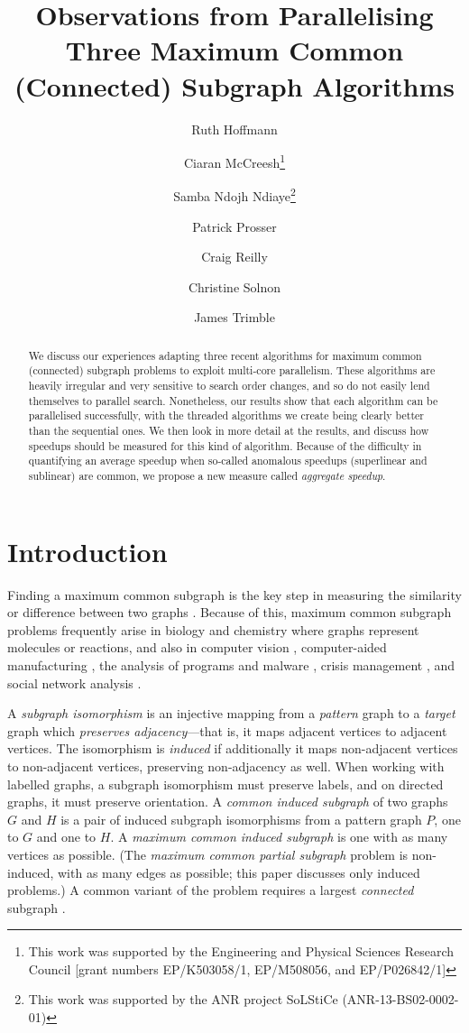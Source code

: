 \documentclass{llncs}
\title{Observations from Parallelising Three Maximum Common (Connected) Subgraph Algorithms}
\author{
    Ruth Hoffmann\inst{1}
    \and Ciaran McCreesh\thanks{This work was supported by the Engineering and Physical Sciences
        Research Council [grant numbers EP/K503058/1, EP/M508056, and EP/P026842/1]}\inst{2}
    \and Samba Ndojh Ndiaye\thanks{This work
    was supported by the ANR project SoLStiCe (ANR-13-BS02-0002-01)}\inst{3}
    \and Patrick Prosser\samethanks[1]\inst{2}
    \and Craig Reilly\samethanks[1]\inst{2}
    \and Christine Solnon\samethanks[2]\inst{4}
    \and James Trimble\samethanks[1]\inst{2}}
\institute{
    University of St Andrews, St Andrews, United Kingdom \and
    University of Glasgow, Glasgow, Scotland \and
    Universit\'e Lyon 1, LIRIS, UMR5205, F-69621, France
    \and INSA-Lyon, LIRIS, UMR5205, F-69621, France}
\begin{document}
\maketitle

\begin{abstract}
    We discuss our experiences adapting three recent algorithms for maximum common (connected)
    subgraph problems to exploit multi-core parallelism. These algorithms are heavily irregular and
    very sensitive to search order changes, and so do not easily lend themselves to parallel search.
    Nonetheless, our results show that each algorithm can be parallelised successfully, with the
    threaded algorithms we create being clearly better than the sequential ones. We then look in
    more detail at the results, and discuss how speedups should be measured for this kind of algorithm.
    Because of the difficulty in quantifying an average speedup when so-called anomalous
    speedups (superlinear and sublinear) are common, we propose a new measure called \emph{aggregate
    speedup}.
\end{abstract}

\section{Introduction}

Finding a maximum common subgraph is the key step in measuring the similarity or difference between
two graphs \cite{DBLP:journals/prl/Bunke97,DBLP:journals/prl/FernandezV01,o:Kriege15}.  Because of
this, maximum common subgraph problems frequently arise in biology and chemistry
\cite{DBLP:journals/jcamd/RaymondW02a,o:EhrlichR11,DBLP:journals/dam/GayFMSS14} where graphs
represent molecules or reactions, and also in computer vision
\cite{DBLP:journals/jair/CookH94,DBLP:conf/gbrpr/CombierDS13}, computer-aided manufacturing
\cite{o:LuoWSN17}, the analysis of programs and malware
\cite{DBLP:conf/icics/GaoRS08,DBLP:journals/compsec/ParkRS13}, crisis management
\cite{o:DelavalladeFLL16}, and social network analysis \cite{DBLP:journals/tkde/FangYZZ15}.

A \emph{subgraph isomorphism} is an injective mapping from a \emph{pattern} graph to a \emph{target}
graph which \emph{preserves adjacency}---that is, it maps adjacent vertices to adjacent vertices.
The isomorphism is \emph{induced} if additionally it maps non-adjacent vertices to non-adjacent
vertices, preserving non-adjacency as well. When working with labelled graphs, a subgraph
isomorphism must preserve labels, and on directed graphs, it must preserve orientation. A
\emph{common induced subgraph} of two graphs $G$ and $H$ is a pair of induced subgraph isomorphisms
from a pattern graph $P$, one to $G$ and one to $H$. A \emph{maximum common induced subgraph} is one
with as many vertices as possible. (The \emph{maximum common partial subgraph} problem is
non-induced, with as many edges as possible; this paper discusses only induced problems.) A common
variant of the problem requires a largest \emph{connected} subgraph
\cite{DBLP:journals/jcamd/RaymondW02a,DBLP:conf/mco/VismaraV08,o:EhrlichR11,o:LuoWSN17}.
\end{document}
